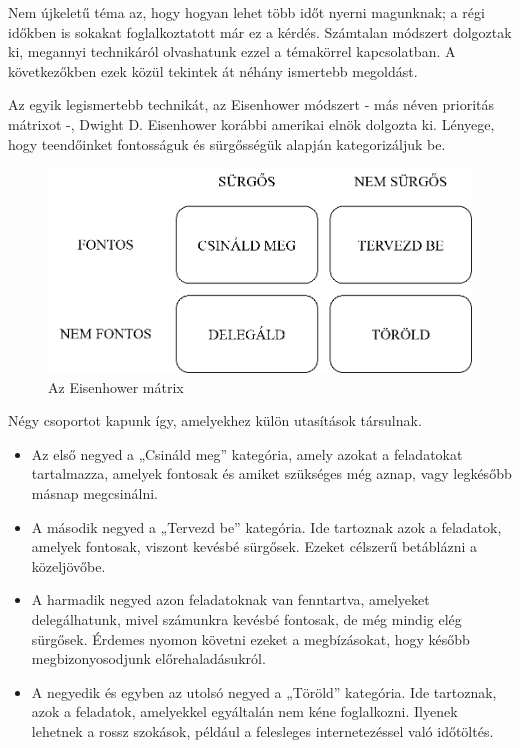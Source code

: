 

Nem újkeletű téma az, hogy hogyan lehet több időt nyerni magunknak; a régi időkben is sokakat foglalkoztatott már ez a kérdés. Számtalan módszert dolgoztak ki, megannyi technikáról olvashatunk ezzel a témakörrel kapcsolatban. A következőkben ezek közül tekintek át néhány ismertebb megoldást.


Az egyik legismertebb technikát, az Eisenhower módszert - más néven prioritás mátrixot -, Dwight D. Eisenhower korábbi amerikai elnök dolgozta ki. Lényege, hogy teendőinket fontosságuk és sürgősségük alapján kategorizáljuk be.

\begin{figure}[h]
	\centering
	\includegraphics[scale=0.7]{images/eisenhower.png}
	\caption{Az Eisenhower mátrix}
	\label{fig:Eisenhower}
\end{figure}

Négy csoportot kapunk így, amelyekhez külön utasítások társulnak.

\begin{itemize}
\item Az első negyed a „Csináld meg” kategória, amely azokat a feladatokat tartalmazza, amelyek fontosak és amiket szükséges még aznap, vagy legkésőbb másnap megcsinálni.
\item A második negyed a „Tervezd be” kategória. Ide tartoznak azok a feladatok, amelyek fontosak, viszont kevésbé sürgősek. Ezeket célszerű betáblázni a közeljövőbe.
\item A harmadik negyed azon feladatoknak van fenntartva, amelyeket delegálhatunk, mivel számunkra kevésbé fontosak, de még mindig elég sürgősek. Érdemes nyomon követni ezeket a megbízásokat, hogy később megbizonyosodjunk előrehaladásukról.
\item A negyedik és egyben az utolsó negyed a „Töröld” kategória. Ide tartoznak, azok a feladatok, amelyekkel egyáltalán nem kéne foglalkozni. Ilyenek lehetnek a rossz szokások, például a felesleges internetezéssel való időtöltés.
\end{itemize}

